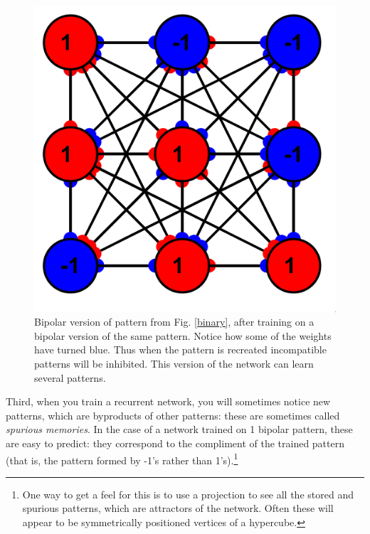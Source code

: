 \begin{figure}[h]
\centering
\includegraphics[scale=.6]{./images/hebb_bipolar_9.png}
\caption[Simbrain screenshot]{Bipolar version of pattern from Fig. \ref{binary}, after training on a bipolar version of the same pattern. Notice how some of the weights have turned blue. Thus when the pattern is recreated incompatible patterns will be inhibited. This version of the network can learn several patterns.}
\label{bipolar}
\end{figure}

Third, when you train a recurrent network, you will sometimes notice new patterns, which are byproducts of other patterns: these are sometimes called \emph{spurious memories}. In the case of a network trained on 1 bipolar pattern, these are easy to predict: they correspond to the compliment of the trained pattern (that is, the pattern formed by -1's rather than 1's).\footnote{One way to get a feel for this is to use a projection to see all the stored and spurious patterns, which are attractors of the network. Often these will appear to be symmetrically positioned vertices of a hypercube.} 


